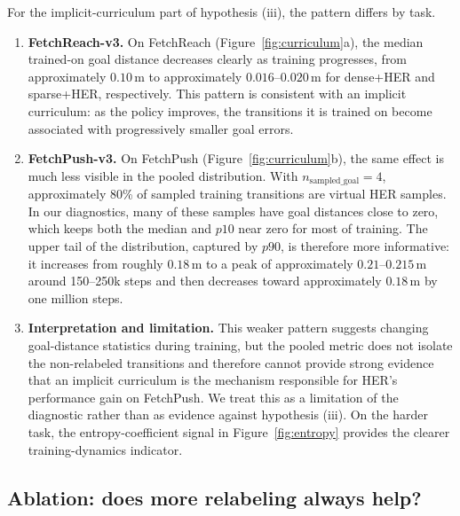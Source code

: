 \documentclass{article}
\begin{document}
For the implicit-curriculum part of hypothesis (iii), the pattern differs by
task.

\begin{enumerate}

    \item \textbf{FetchReach-v3.}
    On FetchReach (Figure~\ref{fig:curriculum}a), the median trained-on goal
    distance decreases clearly as training progresses, from approximately
    $0.10\,\mathrm{m}$ to approximately $0.016$--$0.020\,\mathrm{m}$ for
    dense+HER and sparse+HER, respectively. This pattern is consistent with
    an implicit curriculum: as the policy improves, the transitions it is
    trained on become associated with progressively smaller goal errors.

    \item \textbf{FetchPush-v3.}
    On FetchPush (Figure~\ref{fig:curriculum}b), the same effect is much less
    visible in the pooled distribution. With
    $n_{\text{sampled\_goal}}=4$, approximately 80\% of sampled training
    transitions are virtual HER samples. In our diagnostics, many of these
    samples have goal distances close to zero, which keeps both the median and
    $p10$ near zero for most of training. The upper tail of the distribution,
    captured by $p90$, is therefore more informative: it increases from roughly
    $0.18\,\mathrm{m}$ to a peak of approximately $0.21$--$0.215\,\mathrm{m}$
    around 150--250k steps and then decreases toward approximately
    $0.18\,\mathrm{m}$ by one million steps.

    \item \textbf{Interpretation and limitation.}
    This weaker pattern suggests changing goal-distance statistics during
    training, but the pooled metric does not isolate the non-relabeled
    transitions and therefore cannot provide strong evidence that an implicit
    curriculum is the mechanism responsible for HER's performance gain on
    FetchPush. We treat this as a limitation of the diagnostic rather than as
    evidence against hypothesis (iii). On the harder task, the
    entropy-coefficient signal in Figure~\ref{fig:entropy} provides the clearer
    training-dynamics indicator.

\end{enumerate}

\subsection{Ablation: does more relabeling always help?}
\label{sec:ablation}
\end{document}
